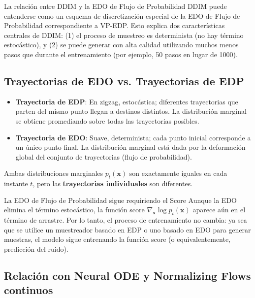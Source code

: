 \documentclass[a4paper]{article}
\begin{document}
\begin{knowledgebox}{La relación entre DDIM y la EDO de Flujo de Probabilidad}
DDIM puede entenderse como un esquema de discretización especial de la EDO de Flujo de Probabilidad correspondiente a VP-EDP. Esto explica dos características centrales de DDIM: (1) el proceso de muestreo es determinista (no hay término estocástico), y (2) se puede generar con alta calidad utilizando muchos menos pasos que durante el entrenamiento (por ejemplo, 50 pasos en lugar de 1000).
\end{knowledgebox}

\subsection{Trayectorias de EDO vs. Trayectorias de EDP}

\begin{itemize}
    \item \textbf{Trayectoria de EDP}: En zigzag, estocástica; diferentes trayectorias que parten del mismo punto llegan a destinos distintos. La distribución marginal se obtiene promediando sobre todas las trayectorias posibles.
    \item \textbf{Trayectoria de EDO}: Suave, determinista; cada punto inicial corresponde a un único punto final. La distribución marginal está dada por la deformación global del conjunto de trayectorias (flujo de probabilidad).
\end{itemize}

Ambas distribuciones marginales $p_t(\mathbf{x})$ son exactamente iguales en cada instante $t$, pero las \textbf{trayectorias individuales} son diferentes.

\begin{warningbox}{La EDO de Flujo de Probabilidad sigue requiriendo el Score}
Aunque la EDO elimina el término estocástico, la función score $\nabla_{\mathbf{x}} \log p_t(\mathbf{x})$ aparece aún en el término de arrastre. Por lo tanto, el proceso de entrenamiento no cambia: ya sea que se utilice un muestreador basado en EDP o uno basado en EDO para generar muestras, el modelo sigue entrenando la función score (o equivalentemente, predicción del ruido).
\end{warningbox}

\subsection{Relación con Neural ODE y Normalizing Flows continuos}
\end{document}
